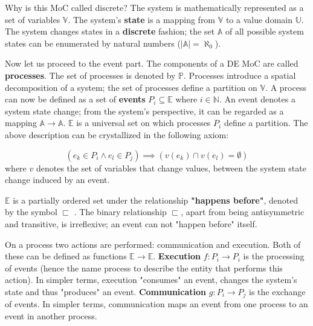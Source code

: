 \documentclass[11pt]{article}
\begin{document}
Why is this MoC called discrete?
The system is mathematically represented as a set of variables \(\mathds{V}\).
The system's \textbf{state} is a mapping from \(\mathds{V}\) to a value domain \(\mathds{U}\).
The system changes states in a \textbf{discrete} fashion; 
the set \(\mathds{A}\) of all possible system states can be enumerated by natural numbers (\(|\mathds{A}| = \aleph_0\)).

Now let us proceed to the event part.
The components of a DE MoC are called \textbf{processes}.
The set of processes is denoted by \(\mathbb{P}\).
Processes introduce a spatial decomposition of a system; the set of processes define a partition on \(\mathds{V}\).
A process can now be defined as a set of \textbf{events} \(P_i \subseteq \mathds{E}\) where \(i\in\mathbb{N}\).
An event denotes a system state change; from the system's perspective, it can be regarded as a mapping \(\mathds{A} \rightarrow \mathds{A}\).
\(\mathds{E}\) is a universal set on which processes \(P_i\) define a partition.
The above description can be crystallized in the following axiom:

\begin{equation}
\tag{Axiom 1}
(e_k \in P_i \land e_l \in P_j) \implies (v(e_k) \cap v(e_l) = \emptyset)
\end{equation}
where \(v\) denotes the set of variables that change values, between the system state change induced by an event.

\(\mathds{E}\) is a partially ordered set under the relationship \textbf{"happens before"}, denoted by the symbol \(\sqsubset\) \cite{Lamport1978}.
The binary relationship \(\sqsubset\), apart from being antisymmetric and transitive, is irreflexive; 
an event can not "happen before" itself.

On a process two actions are performed: communication and execution.
Both of these can be defined as functions \(\mathds{E} \rightarrow \mathds{E}\).
\textbf{Execution} \(f: P_i \rightarrow P_i\) is the processing of events (hence the name process to describe the entity that performs this action).
In simpler terms, execution "consumes" an event, changes the system's state and thus "produces" an event.
\textbf{Communication} \(g: P_i \rightarrow P_j\) is the exchange of events.
In simpler terms, communication maps an event from one process to an event in another process.
\end{document}
